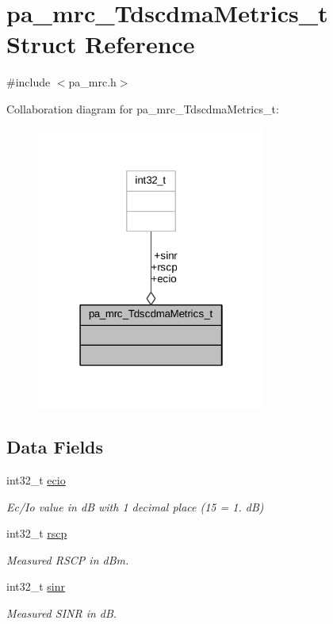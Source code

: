 \hypertarget{structpa__mrc___tdscdma_metrics__t}{}\section{pa\+\_\+mrc\+\_\+\+Tdscdma\+Metrics\+\_\+t Struct Reference}
\label{structpa__mrc___tdscdma_metrics__t}


{\ttfamily \#include $<$pa\+\_\+mrc.\+h$>$}



Collaboration diagram for pa\+\_\+mrc\+\_\+\+Tdscdma\+Metrics\+\_\+t\+:
\nopagebreak
\begin{figure}[H]
\begin{center}
\leavevmode
\includegraphics[width=214pt]{structpa__mrc___tdscdma_metrics__t__coll__graph}
\end{center}
\end{figure}
\subsection*{Data Fields}
\begin{DoxyCompactItemize}
\item 
int32\+\_\+t \hyperlink{structpa__mrc___tdscdma_metrics__t_ab51b7909942c4fc154be788028c09d86}{ecio}
\begin{DoxyCompactList}\small\item\em Ec/\+Io value in dB with 1 decimal place (15 = 1. dB) \end{DoxyCompactList}\item 
int32\+\_\+t \hyperlink{structpa__mrc___tdscdma_metrics__t_a99d9ab9385e51a413b2cc28cc31d08cb}{rscp}
\begin{DoxyCompactList}\small\item\em Measured R\+S\+CP in d\+Bm. \end{DoxyCompactList}\item 
int32\+\_\+t \hyperlink{structpa__mrc___tdscdma_metrics__t_ae87a73f4ea1b84c38ddf187ec1d73a5d}{sinr}
\begin{DoxyCompactList}\small\item\em Measured S\+I\+NR in dB. \end{DoxyCompactList}\end{DoxyCompactItemize}


